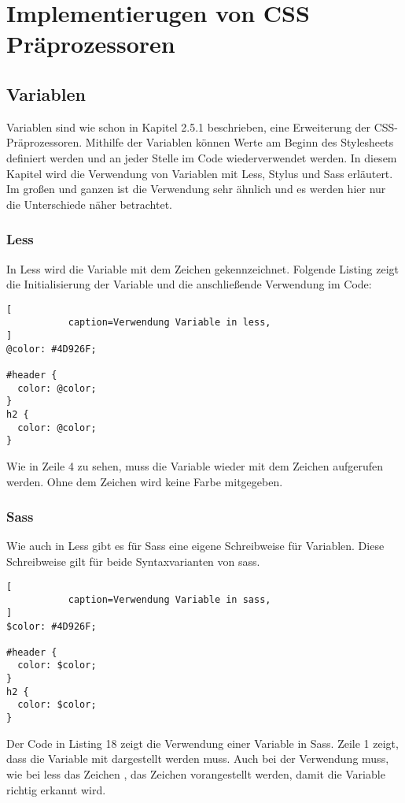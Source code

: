 \section{Implementierugen von CSS Präprozessoren}
\subsection{Variablen}
Variablen sind wie schon in Kapitel 2.5.1 beschrieben, eine Erweiterung der CSS-Präprozessoren. Mithilfe der Variablen können Werte am Beginn des Stylesheets definiert werden und an jeder Stelle im Code wiederverwendet werden. In diesem Kapitel wird die Verwendung von Variablen mit Less, Stylus und Sass erläutert. Im großen und ganzen ist die Verwendung sehr ähnlich und es werden hier nur die Unterschiede näher betrachtet.
\subsubsection{Less}
In Less wird die Variable mit dem Zeichen \glqq{} gekennzeichnet. Folgende Listing zeigt die Initialisierung der Variable und die anschließende Verwendung im Code:
\begin{lstlisting}[
           caption=Verwendung Variable in less,
]
@color: #4D926F;

#header {
  color: @color;
}
h2 {
  color: @color;
}
\end{lstlisting}
Wie in Zeile 4 zu sehen, muss die Variable wieder mit dem \glqq{} Zeichen aufgerufen werden. Ohne dem  \glqq{} Zeichen wird keine Farbe mitgegeben.
\subsubsection{Sass}
Wie auch in Less gibt es für Sass eine eigene Schreibweise für Variablen. Diese Schreibweise gilt für beide Syntaxvarianten von sass.
\begin{lstlisting}[
           caption=Verwendung Variable in sass,
]
$color: #4D926F;

#header {
  color: $color;
}
h2 {
  color: $color;
}
\end{lstlisting}
Der Code in Listing 18 zeigt die Verwendung einer Variable in Sass. Zeile 1 zeigt, dass die Variable mit \grqq{\$}\glqq{} dargestellt werden muss. Auch bei der Verwendung muss, wie bei less das Zeichen \glqq{}, das Zeichen \grqq{\$}\glqq{} vorangestellt werden, damit die Variable richtig erkannt wird.
